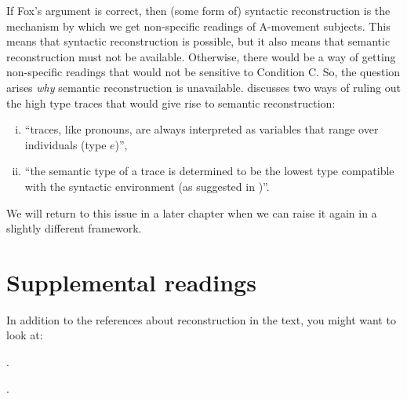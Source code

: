 If Fox's argument is correct, then (some form of) syntactic reconstruction is
the mechanism by which we get non-specific readings of A-movement subjects. This
means that syntactic reconstruction is possible, but it also means that semantic
reconstruction must not be available. Otherwise, there would be a way of getting
non-specific readings that would not be sensitive to Condition C. So, the
question arises \emph{why} semantic reconstruction is unavailable. \citet[p.
171, fn. 41]{fox:2000} discusses two ways of ruling out the high type traces
that would give rise to semantic reconstruction:

\begin{enumerate}[(i)] 
\item ``traces, like pronouns, are always interpreted as variables that range
  over individuals (type $e$)'',
\item ``the semantic type of a trace is determined to be the lowest type
  compatible with the syntactic environment (as suggested in
  \cite{beck:diss})''.
\end{enumerate}
%
We will return to this issue in a later chapter when we can raise it again in a
slightly different framework.

\section{Supplemental readings}
\label{sec:label}

{\setlength{\parindent}{0pt}\setlength{\parskip}{6pt}

In addition to the references about reconstruction in the text, you might want
to look at:

\begin{bibentrylist}
\item {}.
\item {}.
\end{bibentrylist}

}



